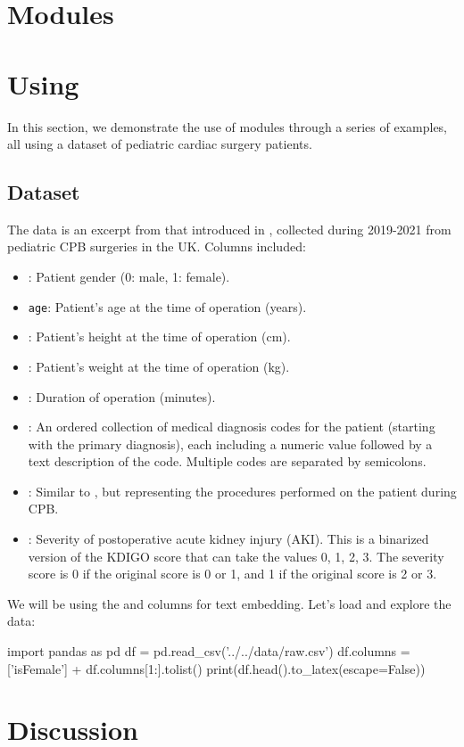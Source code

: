 \documentclass[article]{jss}
\begin{document}
\section[TabuLLM Modules]{ Modules}\label{sec:modules}

\section[Using TabuLLM]{Using }\label{sec:usage}

In this section, we demonstrate the use of  modules through a series of examples, all using a dataset of pediatric cardiac surgery patients.

\subsection{Dataset}\label{subsec:dataset}

The data is an excerpt from that introduced in \cite{sharabiani2024genai}, collected during 2019-2021 from pediatric CPB surgeries in the UK. Columns included:
\begin{itemize}
  \item {}: Patient gender (0: male, 1: female).
  \item \texttt{age}: Patient's age at the time of operation (years).
  \item {}: Patient's height at the time of operation (cm).
  \item {}: Patient's weight at the time of operation (kg).
  \item {}: Duration of operation (minutes).
  \item {}: An ordered collection of medical diagnosis codes for the patient (starting with the primary diagnosis), each including a numeric value followed by a text description of the code. Multiple codes are separated by semicolons.
  \item {}: Similar to , but representing the procedures performed on the patient during CPB.
  \item {}: Severity of postoperative acute kidney injury (AKI). This is a binarized version of the KDIGO score \citep{eknoyan2013kdigo} that can take the values 0, 1, 2, 3. The severity score is 0 if the original score is 0 or 1, and 1 if the original score is 2 or 3.
\end{itemize}
We will be using the  and  columns for text embedding. Let's load and explore the data:
\begin{pyblock}
import pandas as pd
df = pd.read_csv('../../data/raw.csv')
df.columns = ['isFemale'] + df.columns[1:].tolist()
print(df.head().to_latex(escape=False))
\end{pyblock}
\stdoutpythontex %

\section[Discussion]{Discussion} \label{sec:discussion}


\end{document}
